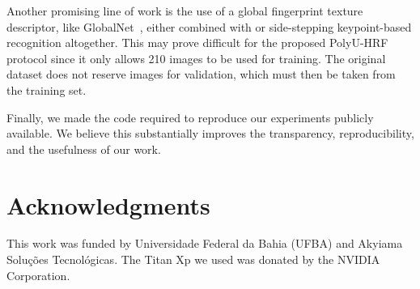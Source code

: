 \documentclass[10pt,twocolumn,letterpaper]{article}
\begin{document}
Another promising line of work is the use of a global fingerprint texture descriptor, like GlobalNet~\cite{zhang-pattern-rec}, either combined with or side-stepping keypoint-based recognition altogether.
This may prove difficult for the proposed PolyU-HRF protocol since it only allows 210 images to be used for training.
The original dataset does not reserve images for validation, which must then be taken from the training set.

Finally, we made the code required to reproduce our experiments publicly available.
We believe this substantially improves the transparency, reproducibility, and the usefulness of our work.

\ifcvprfinal
\section*{Acknowledgments}
This work was funded by Universidade Federal da Bahia (UFBA) and Akyiama Solu\c c\~oes Tecnol\'ogicas.
The Titan Xp we used was donated by the NVIDIA Corporation.
\fi{\small


}
\end{document}
